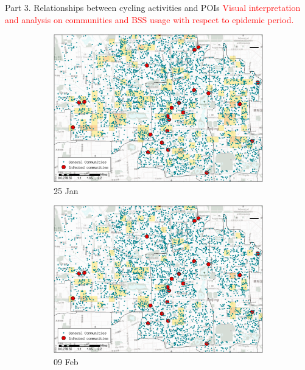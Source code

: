 \documentclass[preprints,ijgi,submit,moreauthors]{Definitions/mdpi}
\begin{document}
Part 3. Relationships between cycling activities and POIs
\textcolor{red}{Visual interpretation and analysis on communities and BSS usage with respect to epidemic period.}
\begin{figure}[H]
    \centering
    \begin{subfigure}{.23\textwidth}
        \includegraphics[width=\textwidth]{Figures/Relation_with_POIs/POI_resD2020_01_25.eps}
        \caption{25 Jan}
    \end{subfigure}
    \begin{subfigure}{.23\textwidth}
        \includegraphics[width=\textwidth]{Figures/Relation_with_POIs/POI_resD2020_02_09.eps}
        \caption{09 Feb}
    \end{subfigure}
    \begin{subfigure}{.23\textwidth}

\end{subfigure}
\end{figure}
\end{document}
